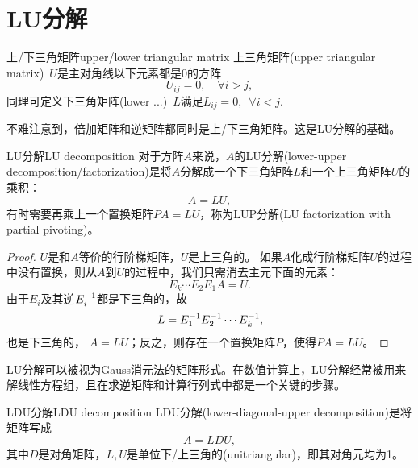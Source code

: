 \section{LU分解}

\begin{definition}{上/下三角矩阵}{upper/lower triangular matrix}
	上三角矩阵(upper triangular matrix)~$U$是主对角线以下元素都是0的方阵
	\[
		U_{ij}=0,\quad\forall i>j,
	\]
	同理可定义下三角矩阵(lower ...)~$L$满足$L_{ij}=0,\enspace\forall i<j.$
\end{definition}
不难注意到，倍加矩阵和逆矩阵都同时是上/下三角矩阵。这是LU分解的基础。
\begin{theorem}{LU分解}{LU decomposition}
	对于方阵$A$来说，$A$的LU分解(lower-upper decomposition/factorization)是将$A$分解成一个下三角矩阵$L$和一个上三角矩阵$U$的乘积：
	\begin{equation}
		A=LU,
	\end{equation}
	有时需要再乘上一个置换矩阵$PA=LU$，称为LUP分解(LU factorization with partial pivoting)。
\end{theorem}
\begin{proof}
	$U$是和$A$等价的行阶梯矩阵，$U$是上三角的。
	如果$A$化成行阶梯矩阵$U$的过程中没有置换，则从$A$到$U$的过程中，我们只需消去主元下面的元素：
	\[
		E_k\cdots E_2E_1A=U.
	\]
	由于$E_i$及其逆$E_i^{-1}$都是下三角的，故
	\[
		L=E_1^{-1} E_2^{-1}\cdots E_k^{-1},
	\]
	也是下三角的，%
	$A=LU$；反之，则存在一个置换矩阵$P$，使得$PA=LU$。
\end{proof}

\begin{remark}
	LU分解可以被视为Gauss消元法的矩阵形式。在数值计算上，LU分解经常被用来解线性方程组，且在求逆矩阵和计算行列式中都是一个关键的步骤。
\end{remark}

\begin{theorem}
	{LDU分解}{LDU decomposition}
	LDU分解(lower-diagonal-upper decomposition)是将矩阵写成
	\[
		A=LDU,
	\]
	其中$D$是对角矩阵，$L,U$是单位下/上三角的(unitriangular)，即其对角元均为1。
\end{theorem}


